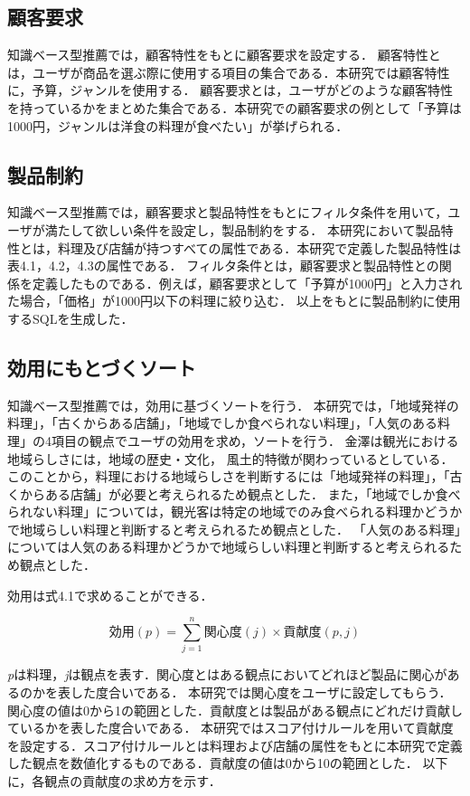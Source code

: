 \documentclass{funthesis}
\begin{document}
\subsection{顧客要求}
知識ベース型推薦では，顧客特性をもとに顧客要求を設定する．
顧客特性とは，ユーザが商品を選ぶ際に使用する項目の集合である．本研究では顧客特性に，予算，ジャンルを使用する．
顧客要求とは，ユーザがどのような顧客特性を持っているかをまとめた集合である．本研究での顧客要求の例として「予算は1000円，ジャンルは洋食の料理が食べたい」が挙げられる．

\subsection{製品制約}
知識ベース型推薦では，顧客要求と製品特性をもとにフィルタ条件を用いて，ユーザが満たして欲しい条件を設定し，製品制約をする．
本研究において製品特性とは，料理及び店舗が持つすべての属性である．本研究で定義した製品特性は表4.1，4.2，4.3の属性である．
フィルタ条件とは，顧客要求と製品特性との関係を定義したものである．例えば，顧客要求として「予算が1000円」と入力された場合，「価格」が1000円以下の料理に絞り込む．
以上をもとに製品制約に使用するSQLを生成した．

\subsection{効用にもとづくソート}
知識ベース型推薦では，効用に基づくソートを行う．
本研究では，「地域発祥の料理」，「古くからある店舗」，「地域でしか食べられない料理」，「人気のある料理」の4項目の観点でユーザの効用を求め，ソートを行う．
金澤\cite{11}は観光における地域らしさには，地域の歴史・文化， 風土的特徴が関わっているとしている．このことから，料理における地域らしさを判断するには「地域発祥の料理」，「古くからある店舗」が必要と考えられるため観点とした．
また，「地域でしか食べられない料理」については，観光客は特定の地域でのみ食べられる料理かどうかで地域らしい料理と判断すると考えられるため観点とした．
「人気のある料理」については人気のある料理かどうかで地域らしい料理と判断すると考えられるため観点とした．

効用は式4.1で求めることができる．

\begin{equation}
効用(p)=\sum_{j=1}^{n} 関心度(j)×貢献度(p,j) 
\end{equation}

{\it p}は料理，{\it j}は観点を表す．関心度とはある観点においてどれほど製品に関心があるのかを表した度合いである．
本研究では関心度をユーザに設定してもらう．関心度の値は0から1の範囲とした．貢献度とは製品がある観点にどれだけ貢献しているかを表した度合いである．
本研究ではスコア付けルールを用いて貢献度を設定する．スコア付けルールとは料理および店舗の属性をもとに本研究で定義した観点を数値化するものである．貢献度の値は0から10の範囲とした．
以下に，各観点の貢献度の求め方を示す．
\end{document}
